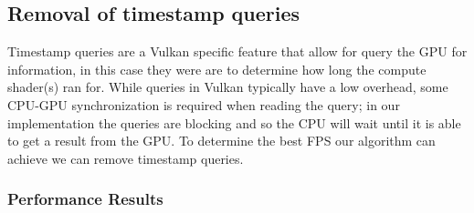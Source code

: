 \subsection{Removal of timestamp queries}
Timestamp queries are a Vulkan specific feature that allow for query the GPU for information, in this case they were are
to determine how long the compute shader(s) ran for. While queries in Vulkan typically have a low overhead, some
CPU-GPU synchronization is required when reading the query; in our implementation the queries are blocking and so the
CPU will wait until it is able to get a result from the GPU. To determine the best FPS our algorithm can achieve we can
remove timestamp queries.

\subsubsection{Performance Results}
